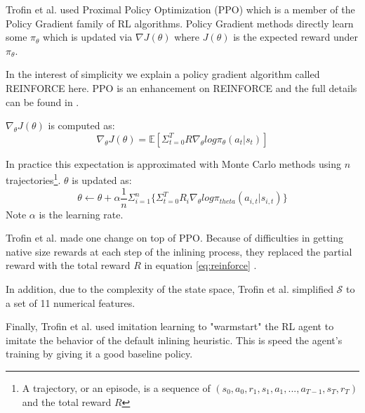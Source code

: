 \documentclass[nohyperref]{article}
\theoremstyle{plain}
\theoremstyle{definition}
\theoremstyle{remark}
\begin{document}
Trofin et al. used Proximal Policy Optimization (PPO) \cite{ppo} which is a member of the Policy Gradient \cite{pg_algo} family of RL algorithms. Policy Gradient methods directly learn some $\pi_{\theta}$ which is updated via $\nabla J(\theta)$ where $J(\theta)$ is the expected reward under $\pi_{\theta}$.

In the interest of simplicity we explain a policy gradient algorithm called REINFORCE \cite{REINFORCE} here. PPO is an enhancement on REINFORCE and the full details can be found in \cite{ppo}.

$\nabla_{\theta}J(\theta)$ is computed as:
\begin{equation} \label{eq:reinforce}
    \nabla_{\theta}J(\theta) = \mathbb{E}\left[\Sigma^{T}_{t=0}R\nabla_{\theta}log\pi_{\theta}(a_t|s_t)\right]
\end{equation}

In practice this expectation is approximated with Monte Carlo methods using $n$ trajectories\footnote{A trajectory, or an episode, is a sequence of $(s_0, a_0, r_1, s_1, a_1, ..., a_{T-1}, s_T, r_T)$ and the total reward $R$}. $\theta$ is updated as:
\begin{equation}\label{eq:updatetheta}
    \theta \leftarrow \theta + \alpha\frac{1}{n}\Sigma^{n}_{i=1}\bigl\{\Sigma^{T}_{t=0}R_{i}\nabla_{\theta}log\pi_{theta}(a_{i,t}|s_{i,t})\bigr\}
\end{equation}
Note $\alpha$ is the learning rate.

Trofin et al. made one change on top of PPO. Because of difficulties in getting native size rewards at each step of the inlining process, they replaced the partial reward with the total reward $R$ in equation \ref{eq:reinforce} \cite{mlgo}.

In addition, due to the complexity of the state space, Trofin et al. simplified $\mathcal{S}$ to a set of 11 numerical features.

Finally, Trofin et al. used imitation learning to "warmstart" the RL agent to imitate the behavior of the default inlining heuristic. This is speed the agent's training by giving it a good baseline policy.


\end{document}
